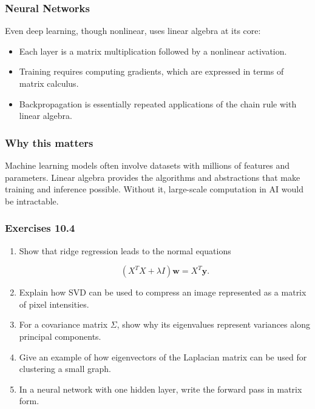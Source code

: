 \documentclass[
  12pt,
  a4paper,
]{article}
\begin{document}
\subsubsection{Neural Networks}\label{neural-networks}

Even deep learning, though nonlinear, uses linear algebra at its core:

\begin{itemize}
\item
  Each layer is a matrix multiplication followed by a nonlinear
  activation.
\item
  Training requires computing gradients, which are expressed in terms of
  matrix calculus.
\item
  Backpropagation is essentially repeated applications of the chain rule
  with linear algebra.
\end{itemize}

\subsubsection{Why this matters}\label{why-this-matters-39}

Machine learning models often involve datasets with millions of features
and parameters. Linear algebra provides the algorithms and abstractions
that make training and inference possible. Without it, large-scale
computation in AI would be intractable.

\subsubsection{Exercises 10.4}\label{exercises-104}

\begin{enumerate}
\def\labelenumi{\arabic{enumi}.}
\item
  Show that ridge regression leads to the normal equations

  \[(X^T X + \lambda I)\mathbf{w} = X^T \mathbf{y}.\]
\item
  Explain how SVD can be used to compress an image represented as a
  matrix of pixel intensities.
\item
  For a covariance matrix \(\Sigma\), show why its eigenvalues represent
  variances along principal components.
\item
  Give an example of how eigenvectors of the Laplacian matrix can be
  used for clustering a small graph.
\item
  In a neural network with one hidden layer, write the forward pass in
  matrix form.
\end{enumerate}
\end{document}
